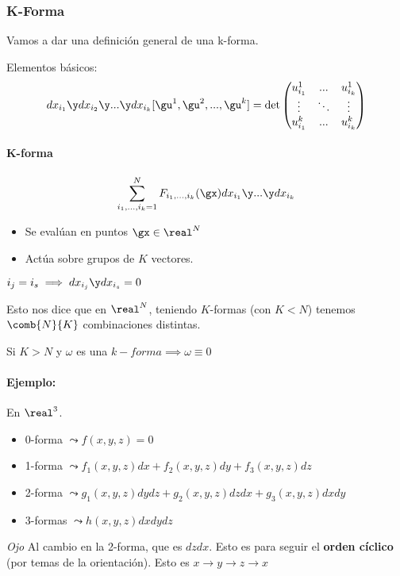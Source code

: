 \subsubsection{K-Forma}

Vamos a dar una definición general de una k-forma.

Elementos básicos:
\[dx_{i_1} \y dx_{i_2}\y...\y dx_{i_k}[\gu^1,\gu^2,...,\gu^k] = \det\begin{pmatrix}
u_{i_1}^1 & ... & u_{i_k}^1\\
\vdots & \ddots & \vdots\\
u_{i_1}^k & ... & u_{i_k}^k
\end{pmatrix}\]

\paragraph{K-forma}

\[
\sum_{i_1,...,i_k=1}^N F_{i_1,...,i_k}(\gx)dx_{i_1} \y ... \y dx_{i_k}
\]

\begin{itemize}
\item Se evalúan en puntos $\gx\in\real^N$
\item Actúa sobre grupos de $K$ vectores.
\end{itemize}

\obs $i_j = i_s \implies dx_{i_j}\y dx_{i_s} = 0$

Esto nos dice que en $\real^N$, teniendo $K$-formas (con $K<N$) tenemos $\comb{N}{K}$ combinaciones distintas.

\obs Si $K>N$ y $\omega$ es una $k-forma \implies \omega \equiv 0$


\paragraph{Ejemplo:} En $\real^3$.

\begin{itemize}
\item 0-forma $\leadsto f(x,y,z) = 0$
\item 1-forma $\leadsto f_1(x,y,z)dx + f_2(x,y,z)dy + f_3(x,y,z)dz$
\item 2-forma $\leadsto g_1(x,y,z)dydz + g_2(x,y,z)dzdx + g_3(x,y,z)dxdy$
\item 3-formas $\leadsto h(x,y,z)dxdydz$
\end{itemize}

\emph{Ojo} Al cambio en la 2-forma, que es $dzdx$. Esto es para seguir el \textbf{orden cíclico} (por temas de la orientación). Esto es $x\to y \to z \to x$


